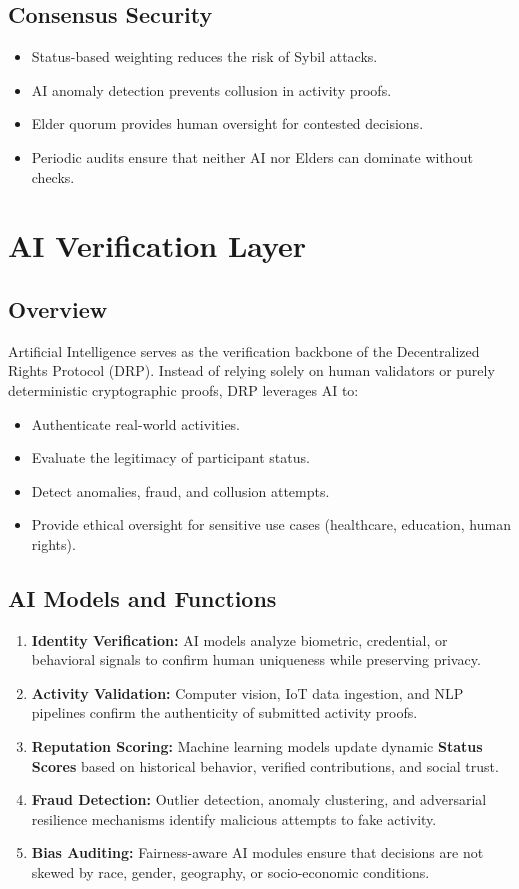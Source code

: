 \documentclass[11pt,a4paper]{article}
\begin{document}
\subsection{Consensus Security}
\begin{itemize}
    \item Status-based weighting reduces the risk of Sybil attacks.
    \item AI anomaly detection prevents collusion in activity proofs.
    \item Elder quorum provides human oversight for contested decisions.
    \item Periodic audits ensure that neither AI nor Elders can dominate without checks.
\end{itemize}

\section{AI Verification Layer}

\subsection{Overview}
Artificial Intelligence serves as the verification backbone of the Decentralized Rights Protocol (DRP). 
Instead of relying solely on human validators or purely deterministic cryptographic proofs, DRP leverages AI to:
\begin{itemize}
    \item Authenticate real-world activities.
    \item Evaluate the legitimacy of participant status.
    \item Detect anomalies, fraud, and collusion attempts.
    \item Provide ethical oversight for sensitive use cases (healthcare, education, human rights).
\end{itemize}

\subsection{AI Models and Functions}
\begin{enumerate}
    \item \textbf{Identity Verification:} AI models analyze biometric, credential, or behavioral signals to confirm human uniqueness while preserving privacy.
    \item \textbf{Activity Validation:} Computer vision, IoT data ingestion, and NLP pipelines confirm the authenticity of submitted activity proofs.
    \item \textbf{Reputation Scoring:} Machine learning models update dynamic \textbf{Status Scores} based on historical behavior, verified contributions, and social trust.
    \item \textbf{Fraud Detection:} Outlier detection, anomaly clustering, and adversarial resilience mechanisms identify malicious attempts to fake activity.
    \item \textbf{Bias Auditing:} Fairness-aware AI modules ensure that decisions are not skewed by race, gender, geography, or socio-economic conditions.
\end{enumerate}
\end{document}
